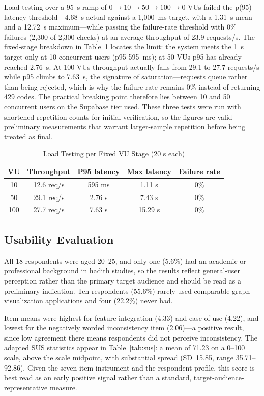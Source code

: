 \documentclass[conference]{IEEEtran}
\begin{document}
Load testing over a 95~s ramp of $0\rightarrow10\rightarrow50\rightarrow100
\rightarrow0$ VUs failed the p(95) latency threshold---4.68~s actual against a
1{,}000~ms target, with a 1.31~s mean and a 12.72~s maximum---while passing the
failure-rate threshold with 0\% failures (2{,}300 of 2{,}300 checks) at an average
throughput of 23.9 requests/s. The fixed-stage breakdown in
Table~\ref{tab:load} locates the limit: the system meets the 1~s target only at 10
concurrent users (p95 595~ms); at 50 VUs p95 has already reached 2.76~s. At 100
VUs throughput actually falls from 29.1 to 27.7 requests/s while p95 climbs to
7.63~s, the signature of saturation---requests queue rather than being rejected,
which is why the failure rate remains 0\% instead of returning 429 codes. The
practical breaking point therefore lies between 10 and 50 concurrent users on the
Supabase tier used. These three tests were run with shortened repetition counts
for initial verification, so the figures are valid preliminary measurements that
warrant larger-sample repetition before being treated as final.

\begin{table}[!t]
\caption{Load Testing per Fixed VU Stage (20 s each)}
\label{tab:load}
\centering
\renewcommand{\arraystretch}{1.3}
\begin{tabular}{ccccc}
\toprule
VU & Throughput & P95 latency & Max latency & Failure rate \\
\midrule
10  & 12.6 req/s & 595 ms  & 1.11 s  & 0\% \\
50  & 29.1 req/s & 2.76 s  & 7.43 s  & 0\% \\
100 & 27.7 req/s & 7.63 s  & 15.29 s & 0\% \\
\bottomrule
\end{tabular}
\end{table}

\subsection{Usability Evaluation}

All 18 respondents were aged 20--25, and only one (5.6\%) had an academic or
professional background in hadith studies, so the results reflect general-user
perception rather than the primary target audience and should be read as a
preliminary indication. Ten respondents (55.6\%) rarely used comparable graph
visualization applications and four (22.2\%) never had.

Item means were highest for feature integration (4.33) and ease of use (4.22),
and lowest for the negatively worded inconsistency item (2.06)---a positive
result, since low agreement there means respondents did not perceive
inconsistency. The adapted SUS statistics appear in Table~\ref{tab:sus}: a mean of
71.23 on a 0--100 scale, above the scale midpoint, with substantial spread
(SD~15.85, range 35.71--92.86). Given the seven-item instrument and the respondent
profile, this score is best read as an early positive signal rather than a
standard, target-audience-representative measure.
\end{document}
